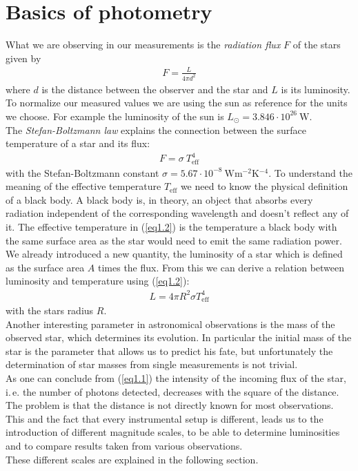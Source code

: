 \section{Basics of photometry}
What we are observing in our measurements is the \textit{radiation flux} $F$ of the stars given by
\begin{align}
	F = \frac{L}{4\pi d^2}\label{eq1.1}
\end{align}
where $d$ is the distance between the observer and the star and $L$ is its luminosity. \\
To normalize our measured values we are using the sun as reference for the units we choose. For example the luminosity of the sun is 
	$ L_{\odot} = 3.846 \cdot 10^{26} \ \si{\watt}$. \\	
The \textit{Stefan-Boltzmann law} explains the connection between the surface temperature of a star and its flux:
\begin{align}
	F = \sigma \ T_{\text{eff}}^4\label{eq1.2}
\end{align}
with the Stefan-Boltzmann constant $\sigma = 5.67 \cdot 10^{-8} \ \si{\watt\meter^{-2}\kelvin^{-4}}$. To understand the meaning of the effective temperature $T_{\text{eff}}$ we need to know the physical definition of a black body. A black body is, in theory, an object that absorbs every radiation independent of the corresponding wavelength and doesn't reflect any of it. The effective temperature in (\ref{eq1.2}) is the temperature a black body with the same surface area as the star would need to emit the same radiation power. \\
We already introduced a new quantity, the luminosity of a star which is defined as the surface area $A$ times the flux. From this we can derive a relation between luminosity and temperature using (\ref{eq1.2}):
\begin{align}
	L = 4\pi R^2\sigma T_{\text{eff}}^4
\end{align}
with the stars radius $R$. \\
Another interesting parameter in astronomical observations is the mass of the observed star, which determines its  evolution. In particular the initial mass of the star is the parameter that allows us to predict his fate, but unfortunately the determination of star masses from single measurements is not trivial. \\
As one can conclude from (\ref{eq1.1}) the intensity of the incoming flux of the star, i.\,e. the number of photons detected, decreases with the square of the distance. The problem is that the distance is not directly known for most observations. This and the fact that every instrumental setup is different, leads us to the introduction of different magnitude scales, to be able to determine luminosities and to compare results taken from various observations. \\
These different scales are explained in the following section.

